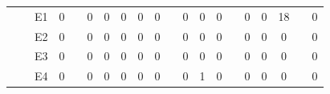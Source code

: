 \documentclass[12pt]{article}
\begin{document}
\begin{table}[H]
{\begin{tabular}{clcccccccccccccccccc}
					   & \multicolumn{1}{l|}{} & \multicolumn{1}{c|}{E1}   & \multicolumn{1}{c|}{0}    & \multicolumn{1}{c|}{}                     & \multicolumn{1}{c|}{0}    & \multicolumn{1}{c|}{0}    & \multicolumn{1}{c|}{0}    & \multicolumn{1}{c|}{0}    & \multicolumn{1}{c|}{0}  & \multicolumn{1}{c|}{}                     & \multicolumn{1}{c|}{0}    & \multicolumn{1}{c|}{0}    & \multicolumn{1}{c|}{0}    & \multicolumn{1}{c|}{}                     & \multicolumn{1}{c|}{0}  & \multicolumn{1}{c|}{0}  & \multicolumn{1}{c|}{18} & \multicolumn{1}{c|}{}                     & \multicolumn{1}{c|}{0}  \\ \cline{3-4} \cline{6-10} \cline{12-14} \cline{16-18} \cline{20-20} 
					   & \multicolumn{1}{l|}{} & \multicolumn{1}{c|}{E2}   & \multicolumn{1}{c|}{0}    & \multicolumn{1}{c|}{}                     & \multicolumn{1}{c|}{0}    & \multicolumn{1}{c|}{0}    & \multicolumn{1}{c|}{0}    & \multicolumn{1}{c|}{0}    & \multicolumn{1}{c|}{0}  & \multicolumn{1}{c|}{}                     & \multicolumn{1}{c|}{0}    & \multicolumn{1}{c|}{0}    & \multicolumn{1}{c|}{0}    & \multicolumn{1}{c|}{}                     & \multicolumn{1}{c|}{0}  & \multicolumn{1}{c|}{0}  & \multicolumn{1}{c|}{0}  & \multicolumn{1}{c|}{}                     & \multicolumn{1}{c|}{0}  \\ \cline{3-4} \cline{6-10} \cline{12-14} \cline{16-18} \cline{20-20} 
					   & \multicolumn{1}{l|}{} & \multicolumn{1}{c|}{E3}   & \multicolumn{1}{c|}{0}    & \multicolumn{1}{c|}{}                     & \multicolumn{1}{c|}{0}    & \multicolumn{1}{c|}{0}    & \multicolumn{1}{c|}{0}    & \multicolumn{1}{c|}{0}    & \multicolumn{1}{c|}{0}  & \multicolumn{1}{c|}{}                     & \multicolumn{1}{c|}{0}    & \multicolumn{1}{c|}{0}    & \multicolumn{1}{c|}{0}    & \multicolumn{1}{c|}{}                     & \multicolumn{1}{c|}{0}  & \multicolumn{1}{c|}{0}  & \multicolumn{1}{c|}{0}  & \multicolumn{1}{c|}{}                     & \multicolumn{1}{c|}{0}  \\ \cline{3-4} \cline{6-10} \cline{12-14} \cline{16-18} \cline{20-20} 
					   & \multicolumn{1}{l|}{} & \multicolumn{1}{c|}{E4}   & \multicolumn{1}{c|}{0}    & \multicolumn{1}{c|}{}                     & \multicolumn{1}{c|}{0}    & \multicolumn{1}{c|}{0}    & \multicolumn{1}{c|}{0}    & \multicolumn{1}{c|}{0}    & \multicolumn{1}{c|}{0}  & \multicolumn{1}{c|}{}                     & \multicolumn{1}{c|}{0}    & \multicolumn{1}{c|}{1}    & \multicolumn{1}{c|}{0}    & \multicolumn{1}{c|}{}                     & \multicolumn{1}{c|}{0}  & \multicolumn{1}{c|}{0}  & \multicolumn{1}{c|}{0}  & \multicolumn{1}{c|}{}                     & \multicolumn{1}{c|}{0}  \\ \cline{3-4} \cline{6-10} \cline{12-14} \cline{16-18} \cline{20-20} 

\end{tabular}}
\end{table}
\end{document}
